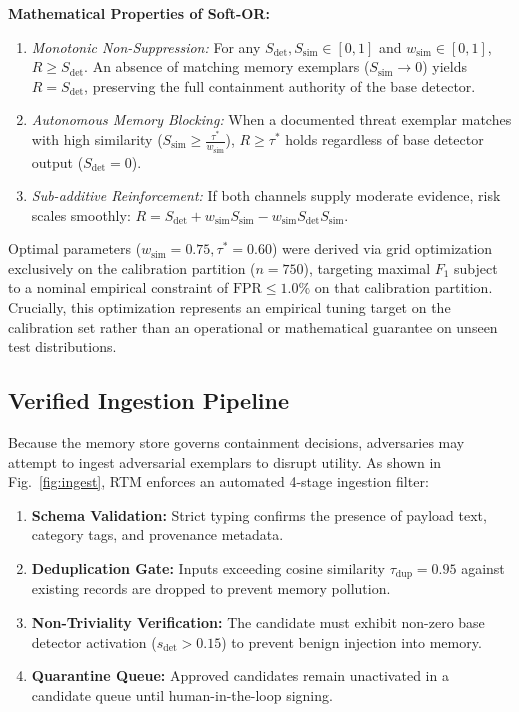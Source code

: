 \documentclass[conference]{IEEEtran}
\begin{document}
\noindent\textbf{Mathematical Properties of Soft-OR:}
\begin{enumerate}
    \item \textit{Monotonic Non-Suppression:} For any $S_{\text{det}}, S_{\text{sim}} \in [0, 1]$ and $w_{\text{sim}} \in [0, 1]$, $R \ge S_{\text{det}}$. An absence of matching memory exemplars ($S_{\text{sim}} \to 0$) yields $R = S_{\text{det}}$, preserving the full containment authority of the base detector.
    \item \textit{Autonomous Memory Blocking:} When a documented threat exemplar matches with high similarity ($S_{\text{sim}} \ge \frac{\tau^*}{w_{\text{sim}}}$), $R \ge \tau^*$ holds regardless of base detector output ($S_{\text{det}} = 0$).
    \item \textit{Sub-additive Reinforcement:} If both channels supply moderate evidence, risk scales smoothly: $R = S_{\text{det}} + w_{\text{sim}} S_{\text{sim}} - w_{\text{sim}} S_{\text{det}} S_{\text{sim}}$.
\end{enumerate}
Optimal parameters ($w_{\text{sim}} = 0.75, \tau^* = 0.60$) were derived via grid optimization exclusively on the calibration partition ($n=750$), targeting maximal $F_1$ subject to a nominal empirical constraint of $\text{FPR} \le 1.0\%$ on that calibration partition. Crucially, this optimization represents an empirical tuning target on the calibration set rather than an operational or mathematical guarantee on unseen test distributions.

\subsection{Verified Ingestion Pipeline}
Because the memory store governs containment decisions, adversaries may attempt to ingest adversarial exemplars to disrupt utility. As shown in Fig.~\ref{fig:ingest}, RTM enforces an automated 4-stage ingestion filter:
\begin{enumerate}
    \item \textbf{Schema Validation:} Strict typing confirms the presence of payload text, category tags, and provenance metadata.
    \item \textbf{Deduplication Gate:} Inputs exceeding cosine similarity $\tau_{\text{dup}} = 0.95$ against existing records are dropped to prevent memory pollution.
    \item \textbf{Non-Triviality Verification:} The candidate must exhibit non-zero base detector activation ($s_{\text{det}} > 0.15$) to prevent benign injection into memory.
    \item \textbf{Quarantine Queue:} Approved candidates remain unactivated in a candidate queue until human-in-the-loop signing.
\end{enumerate}
\end{document}
